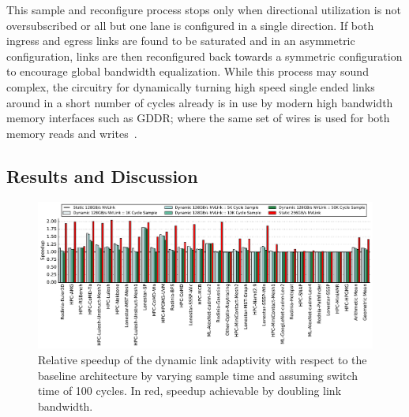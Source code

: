 This sample and 
reconfigure process stops only when directional utilization is not 
oversubscribed or all but one lane is configured in a single direction. If 
both ingress and egress links are found to be saturated and in an asymmetric 
configuration, links are then reconfigured back towards a symmetric configuration 
to encourage global bandwidth equalization. While this process may sound 
complex, the circuitry for dynamically turning high speed single ended links 
around in a short number of cycles already is in use by modern high bandwidth 
memory interfaces such as GDDR; where the same set of wires is used for both memory reads 
and writes~\cite{hynixgddr51Gb}.

\subsection{Results and Discussion} 

\begin{figure}[tp]
	\centering
	\includegraphics[width=1.0\textwidth]{figures/plot_nvlink_sample_time.pdf}
	\caption{Relative speedup of the dynamic link adaptivity with respect to
		the baseline architecture by varying sample time and assuming switch 
		time of
		100 cycles. In red, speedup achievable by doubling link 
		bandwidth.}
	\label{fig:sampletime}
	\vspace{-.1in}
\end{figure}

